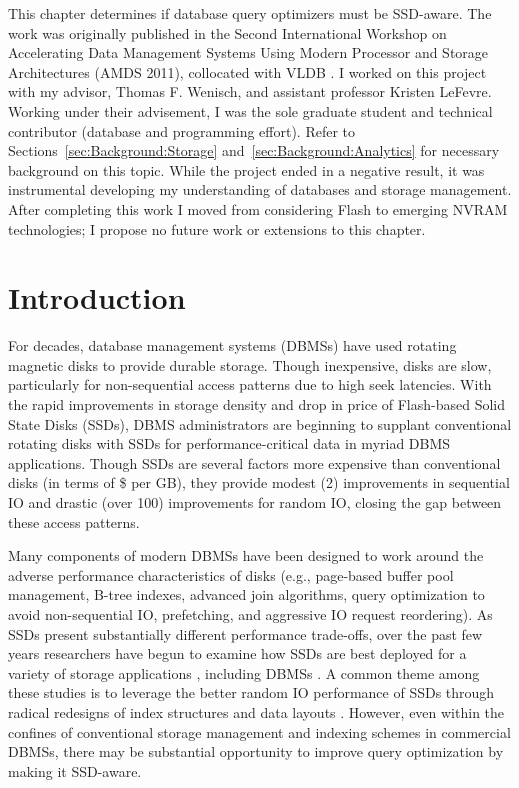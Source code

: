 This chapter determines if database query optimizers must be SSD-aware.
The work was originally published in the Second International Workshop on Accelerating Data Management Systems Using Modern Processor and Storage Architectures (AMDS 2011), collocated with VLDB \cite{PelleyWenisch11}.
I worked on this project with my advisor, Thomas F. Wenisch, and assistant professor Kristen LeFevre.
Working under their advisement, I was the sole graduate student and technical contributor (database and programming effort).
Refer to Sections~\ref{sec:Background:Storage} and~\ref{sec:Background:Analytics} for necessary background on this topic.
While the project ended in a negative result, it was instrumental developing my understanding of databases and storage management.
After completing this work I moved from considering Flash to emerging NVRAM technologies; I propose no future work or extensions to this chapter.

\section{Introduction}
\label{sec:FlashOpti:Intro}

For decades, database management systems (DBMSs) have used rotating magnetic disks to provide durable storage.
Though inexpensive, disks are slow, particularly for non-sequential access patterns due to high seek latencies.
With the rapid improvements in storage density and drop in price of Flash-based Solid State Disks (SSDs), DBMS administrators are beginning to supplant conventional rotating disks with SSDs for performance-critical data in myriad DBMS applications.
Though SSDs are several factors more expensive than conventional disks (in terms of \$ per GB), they provide modest (2\texttimes) improvements in sequential IO and drastic (over 100\texttimes) improvements for random IO, closing the gap between these access patterns.

Many components of modern DBMSs have been designed to work around the adverse performance characteristics of disks (e.g., page-based buffer pool management, B-tree indexes, advanced join algorithms, query optimization to avoid non-sequential IO, prefetching, and aggressive IO request reordering).  
As SSDs present substantially different performance trade-offs, over the past few years researchers have begun to examine how SSDs are best deployed for a variety of storage applications \cite{Bouganim09uflip:understanding, Chen2009}, including DBMSs \cite{Lee2008, Yin2009, Li2009, Baumann2010, Tsirogiannis2009}.  
A common theme among these studies is to leverage the better random IO performance of SSDs through radical redesigns of index structures \cite{Yin2009, Li2009} and data layouts \cite{Baumann2010, Tsirogiannis2009}. 
However, even within the confines of conventional storage management and indexing schemes in commercial DBMSs, there may be substantial opportunity to improve query optimization by making it SSD-aware.

